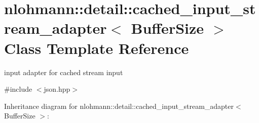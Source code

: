 \hypertarget{classnlohmann_1_1detail_1_1cached__input__stream__adapter}{}\section{nlohmann\+:\+:detail\+:\+:cached\+\_\+input\+\_\+stream\+\_\+adapter$<$ Buffer\+Size $>$ Class Template Reference}
\label{classnlohmann_1_1detail_1_1cached__input__stream__adapter}


input adapter for cached stream input  




{\ttfamily \#include $<$json.\+hpp$>$}



Inheritance diagram for nlohmann\+:\+:detail\+:\+:cached\+\_\+input\+\_\+stream\+\_\+adapter$<$ Buffer\+Size $>$\+:
